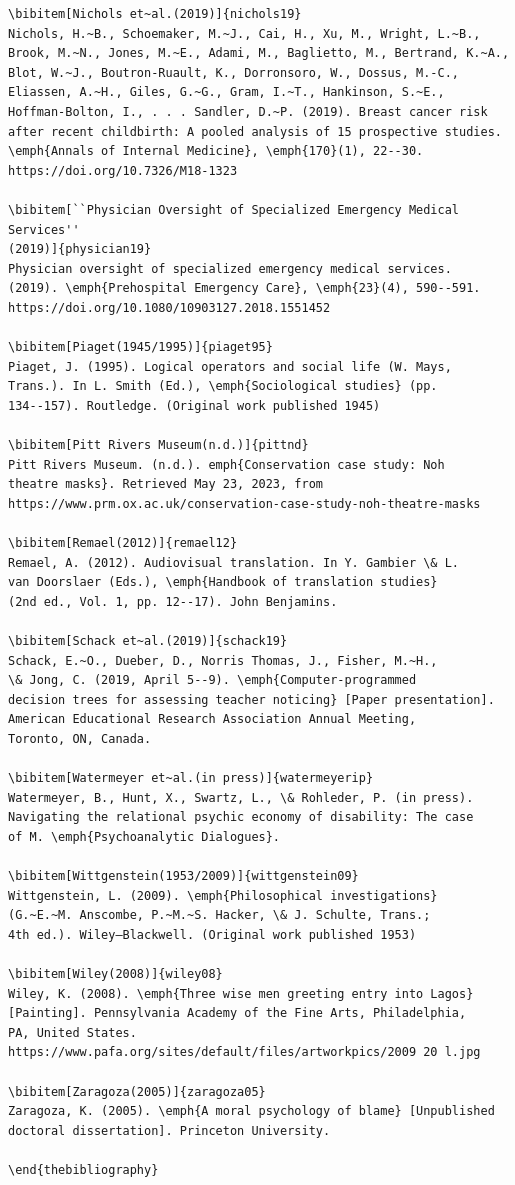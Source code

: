 \documentclass[]{interact}
\theoremstyle{plain}%
\theoremstyle{definition}
\theoremstyle{remark}
\begin{document}
\begin{verbatim}
\bibitem[Nichols et~al.(2019)]{nichols19}
Nichols, H.~B., Schoemaker, M.~J., Cai, H., Xu, M., Wright, L.~B.,
Brook, M.~N., Jones, M.~E., Adami, M., Baglietto, M., Bertrand, K.~A.,
Blot, W.~J., Boutron-Ruault, K., Dorronsoro, W., Dossus, M.-C.,
Eliassen, A.~H., Giles, G.~G., Gram, I.~T., Hankinson, S.~E.,
Hoffman-Bolton, I., . . . Sandler, D.~P. (2019). Breast cancer risk
after recent childbirth: A pooled analysis of 15 prospective studies.
\emph{Annals of Internal Medicine}, \emph{170}(1), 22--30.
https://doi.org/10.7326/M18-1323

\bibitem[``Physician Oversight of Specialized Emergency Medical Services''
(2019)]{physician19}
Physician oversight of specialized emergency medical services.
(2019). \emph{Prehospital Emergency Care}, \emph{23}(4), 590--591.
https://doi.org/10.1080/10903127.2018.1551452

\bibitem[Piaget(1945/1995)]{piaget95}
Piaget, J. (1995). Logical operators and social life (W. Mays,
Trans.). In L. Smith (Ed.), \emph{Sociological studies} (pp.
134--157). Routledge. (Original work published 1945)

\bibitem[Pitt Rivers Museum(n.d.)]{pittnd}
Pitt Rivers Museum. (n.d.). emph{Conservation case study: Noh
theatre masks}. Retrieved May 23, 2023, from 
https://www.prm.ox.ac.uk/conservation-case-study-noh-theatre-masks

\bibitem[Remael(2012)]{remael12}
Remael, A. (2012). Audiovisual translation. In Y. Gambier \& L.
van Doorslaer (Eds.), \emph{Handbook of translation studies}
(2nd ed., Vol. 1, pp. 12--17). John Benjamins.

\bibitem[Schack et~al.(2019)]{schack19}
Schack, E.~O., Dueber, D., Norris Thomas, J., Fisher, M.~H.,
\& Jong, C. (2019, April 5--9). \emph{Computer-programmed
decision trees for assessing teacher noticing} [Paper presentation].
American Educational Research Association Annual Meeting,
Toronto, ON, Canada.

\bibitem[Watermeyer et~al.(in press)]{watermeyerip}
Watermeyer, B., Hunt, X., Swartz, L., \& Rohleder, P. (in press).
Navigating the relational psychic economy of disability: The case
of M. \emph{Psychoanalytic Dialogues}.

\bibitem[Wittgenstein(1953/2009)]{wittgenstein09}
Wittgenstein, L. (2009). \emph{Philosophical investigations}
(G.~E.~M. Anscombe, P.~M.~S. Hacker, \& J. Schulte, Trans.;
4th ed.). Wiley–Blackwell. (Original work published 1953)

\bibitem[Wiley(2008)]{wiley08}
Wiley, K. (2008). \emph{Three wise men greeting entry into Lagos}
[Painting]. Pennsylvania Academy of the Fine Arts, Philadelphia,
PA, United States.
https://www.pafa.org/sites/default/files/artworkpics/2009 20 l.jpg

\bibitem[Zaragoza(2005)]{zaragoza05}
Zaragoza, K. (2005). \emph{A moral psychology of blame} [Unpublished
doctoral dissertation]. Princeton University.

\end{thebibliography}
\end{verbatim}
\end{document}
